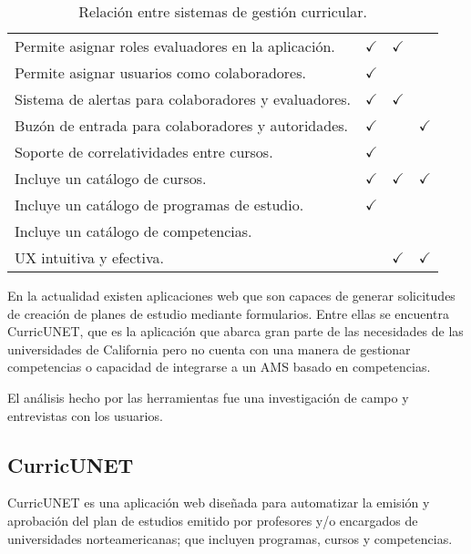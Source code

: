 \begin{table}[H]
\begin{tabular}{lllccl}
\multicolumn{3}{l}{Permite asignar roles evaluadores en la aplicación.}            & $\checkmark$                     & $\checkmark$          &              \\
\multicolumn{3}{l}{Permite asignar usuarios como colaboradores.}                   & $\checkmark$                     &                       &              \\
\multicolumn{3}{l}{Sistema de alertas para colaboradores y evaluadores.}           & $\checkmark$                     & $\checkmark$          &              \\
\multicolumn{3}{l}{Buzón de entrada para colaboradores y autoridades.} 			   & $\checkmark$                     &                       & $\checkmark$ \\
\multicolumn{3}{l}{Soporte de correlatividades entre cursos.}                      & $\checkmark$ 					  &						  &              \\
\multicolumn{3}{l}{Incluye un catálogo de cursos.}                   		   	   & $\checkmark$					  &	$\checkmark$		  & $\checkmark$ \\
\multicolumn{3}{l}{Incluye un catálogo de programas de estudio.}                   & $\checkmark$					  &	            		  &              \\
\multicolumn{3}{l}{Incluye un catálogo de competencias.}                   	       & 								  &						  & 			 \\
\multicolumn{3}{l}{UX intuitiva y efectiva.}     			   					   &                                  & $\checkmark$          & $\checkmark$ \\
\bottomrule
\end{tabular}
\caption{Relación entre sistemas de gestión curricular.}
\label{relacion-sistemas}
\end{table}

En la actualidad existen aplicaciones web que son capaces de generar solicitudes de creación de planes de estudio mediante formularios. Entre ellas se encuentra CurricUNET, que es la aplicación que abarca gran parte de las necesidades de las universidades de California pero no cuenta con una manera de gestionar competencias o capacidad de integrarse a un AMS basado en competencias.

El análisis hecho por las herramientas fue una investigación de campo y entrevistas con los usuarios.

\subsection{CurricUNET}
CurricUNET es una aplicación web diseñada para automatizar la emisión y aprobación del plan de estudios emitido por profesores y/o encargados de universidades norteamericanas; que incluyen programas, cursos y competencias\citep{curricunet_webpage}.

